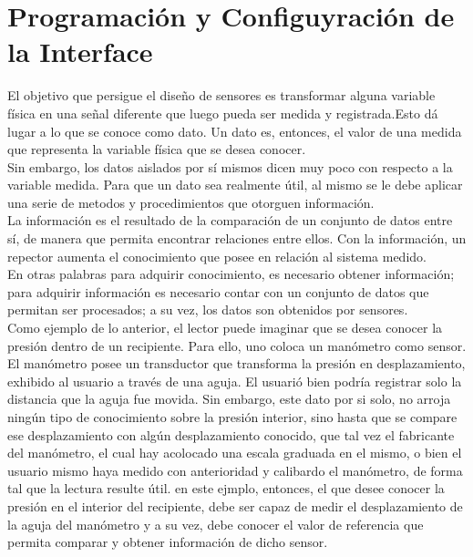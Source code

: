 \section{Programación y Configuyración de la Interface}

	El objetivo que persigue el diseño de sensores es transformar alguna variable física en una señal diferente que luego pueda ser medida y registrada.Esto dá lugar a lo que se conoce
como dato. Un dato es, entonces, el valor de una medida que representa la variable física que se desea conocer.\\
	Sin embargo, los datos aislados por sí mismos dicen muy poco con respecto a la variable medida. Para que un dato sea realmente útil, al mismo se le debe aplicar una serie de metodos
y procedimientos que otorguen información.\\
	La información es el resultado de la comparación de un conjunto de datos entre sí, de manera que permita encontrar relaciones entre ellos. Con la información, un repector aumenta el
conocimiento que posee en relación al sistema medido.\\
	En otras palabras para adquirir conocimiento, es necesario obtener información; para adquirir información es necesario contar con un conjunto de datos que permitan ser procesados;
a su vez, los datos son obtenidos por sensores.\\
	Como ejemplo de lo anterior, el lector puede imaginar que se desea conocer la presión dentro de un recipiente. Para ello, uno coloca un manómetro como sensor. El manómetro posee un
transductor que transforma la presión en desplazamiento, exhibido al usuario a través de una aguja. El usuarió bien podría registrar solo la distancia que la aguja fue movida. Sin embargo,
este dato por si solo, no arroja ningún tipo de conocimiento sobre la presión interior, sino hasta que se compare ese desplazamiento con algún desplazamiento conocido, que tal vez
el fabricante del manómetro, el cual hay acolocado una escala graduada en el mismo, o bien el usuario mismo haya medido con anterioridad y calibardo el manómetro, de forma tal que la lectura
resulte útil. en este ejmplo, entonces, el que desee conocer la presión en el interior del recipiente, debe ser capaz de medir el desplazamiento de la aguja del manómetro y a su vez, debe conocer
el valor de referencia que permita comparar y obtener información de dicho sensor.\\
